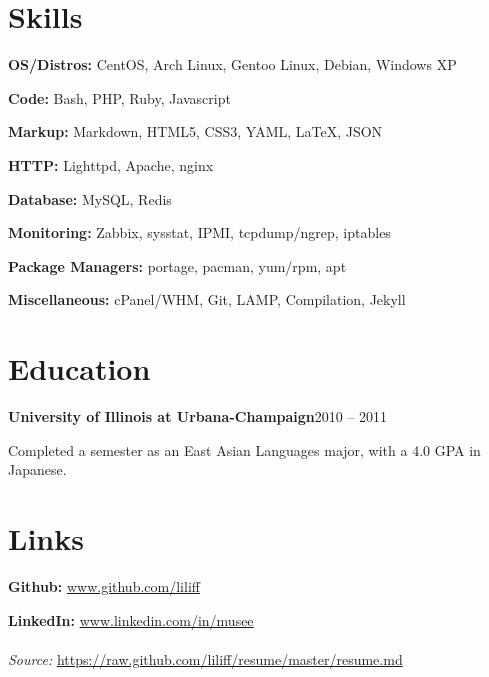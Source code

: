 \documentclass{article}
\newenvironment{entity}[2]{%
    \textbf{#1}\hfill #2\par
}{
    \vspace{0.1em}%
    \par%
}
\begin{document}
\section{Skills}

\textbf{OS/Distros:} CentOS, Arch Linux, Gentoo Linux, Debian, Windows XP\par
\textbf{Code:} Bash, PHP, Ruby, Javascript\par
\textbf{Markup:} Markdown, HTML5, CSS3, YAML, \LaTeX, JSON\par
\textbf{HTTP:} Lighttpd, Apache, nginx\par
\textbf{Database:} MySQL, Redis\par
\textbf{Monitoring:} Zabbix, sysstat, IPMI, tcpdump/ngrep, iptables\par
\textbf{Package Managers:} portage, pacman, yum/rpm, apt\par
\textbf{Miscellaneous:} cPanel/WHM, Git, LAMP, Compilation, Jekyll
\section{Education}

    \begin{entity}{University of Illinois at Urbana-Champaign}{2010 -- 2011}

Completed a semester as an East Asian Languages major, with a 4.0 GPA in Japanese.

    \end{entity}
\section{Links}

\textbf{Github:} \url{www.github.com/liliff}\par
\textbf{LinkedIn:} \url{www.linkedin.com/in/musee}
\\
\\
\textsl{Source:} \url{https://raw.github.com/liliff/resume/master/resume.md}
\end{document}
